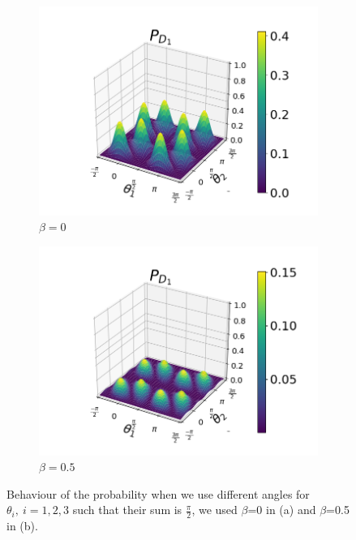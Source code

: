 \documentclass[12pt]{book}
\begin{document}
\begin{figure}[!t]
\begin{subfigure}[b]{0.4\linewidth}
\includegraphics[width=\linewidth]{images/beta_theta2.png}
\caption{$\beta=0$}
\label{fig:BS1}
\end{subfigure}
\begin{subfigure}[b]{0.4\linewidth}
\includegraphics[width=\linewidth]{images/beta_theta.png}
\caption{$\beta=0.5$}
\label{fig:westminster_aerea}
\end{subfigure}

\caption{Behaviour of the probability when we use different angles for $\theta_i, ~i = 1,2,3$ such that their sum is $\frac{\pi}{2}$, we used $\beta$=0 in (a) and $\beta$=0.5 in (b).}
\label{recidito}
\end{figure}
\end{document}
